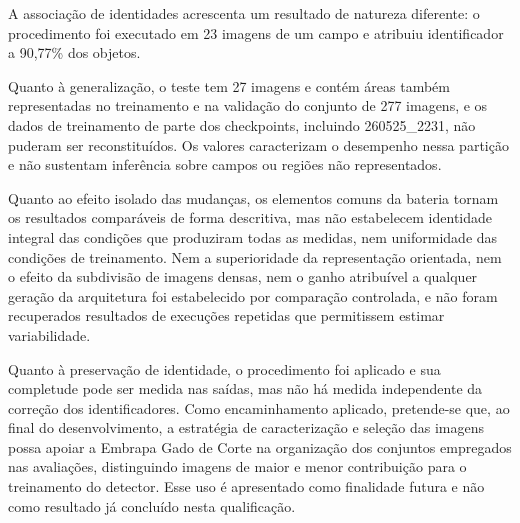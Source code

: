 A associa\c{c}\~ao de identidades acrescenta um resultado de natureza diferente: o procedimento foi executado em 23 imagens de um campo e atribuiu identificador a 90,77\% dos objetos.

Quanto \`a generaliza\c{c}\~ao, o teste tem 27 imagens e cont\'em \'areas tamb\'em representadas no treinamento e na valida\c{c}\~ao do conjunto de 277 imagens, e os dados de treinamento de parte dos checkpoints, incluindo 260525\_2231, n\~ao puderam ser reconstitu\'idos. Os valores caracterizam o desempenho nessa parti\c{c}\~ao e n\~ao sustentam infer\^encia sobre campos ou regi\~oes n\~ao representados.

Quanto ao efeito isolado das mudan\c{c}as, os elementos comuns da bateria tornam os resultados compar\'aveis de forma descritiva, mas n\~ao estabelecem identidade integral das condi\c{c}\~oes que produziram todas as medidas, nem uniformidade das condi\c{c}\~oes de treinamento. Nem a superioridade da representa\c{c}\~ao orientada, nem o efeito da subdivis\~ao de imagens densas, nem o ganho atribu\'ivel a qualquer gera\c{c}\~ao da arquitetura foi estabelecido por compara\c{c}\~ao controlada, e n\~ao foram recuperados resultados de execu\c{c}\~oes repetidas que permitissem estimar variabilidade.

Quanto \`a preserva\c{c}\~ao de identidade, o procedimento foi aplicado e sua completude pode ser medida nas sa\'idas, mas n\~ao h\'a medida independente da corre\c{c}\~ao dos identificadores. Como encaminhamento aplicado, pretende-se que, ao final do desenvolvimento, a estrat\'egia de caracteriza\c{c}\~ao e sele\c{c}\~ao das imagens possa apoiar a Embrapa Gado de Corte na organiza\c{c}\~ao dos conjuntos empregados nas avalia\c{c}\~oes, distinguindo imagens de maior e menor contribui\c{c}\~ao para o treinamento do detector. Esse uso \'e apresentado como finalidade futura e n\~ao como resultado j\'a conclu\'ido nesta qualifica\c{c}\~ao.
